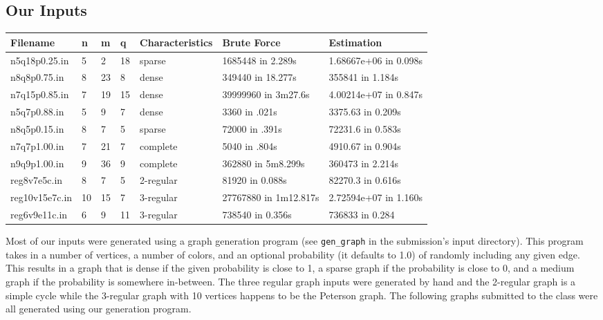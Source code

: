 \documentclass[14]{article}
\begin{document}
\subsection{Our Inputs}
\begin{center}
    \begin{tabular}{ | l | l | l | l | l | l | l | }
    \hline
    \textbf{Filename} & \textbf{n} & \textbf{m} & \textbf{q} & \textbf{Characteristics} & \textbf{Brute Force} & \textbf{Estimation} \\ \hline
    n5q18p0.25.in & 5 & 2 & 18 &sparse & 1685448 in 2.289s &1.68667e+06 in 0.098s   \\ \hline

    n8q8p0.75.in & 8 & 23 & 8 &dense & 349440 in 18.277s &355841 in 1.184s \\ \hline

    n7q15p0.85.in & 7 & 19 & 15 &dense & 39999960 in 3m27.6s & 4.00214e+07 in 0.847s\\ \hline

    n5q7p0.88.in & 5 & 9 & 7 &dense & 3360 in .021s & 3375.63 in 0.209s    \\ \hline

    n8q5p0.15.in & 8 & 7 & 5 &sparse & 72000 in .391s & 72231.6  in 0.583s  \\ \hline

    n7q7p1.00.in & 7 & 21 & 7 &complete & 5040 in .804s &4910.67  in 0.904s\\ \hline

    n9q9p1.00.in & 9 & 36 & 9 &complete & 362880 in 5m8.299s &360473 in 2.214s   \\ \hline

    reg8v7e5c.in & 8 & 7 & 5 & 2-regular & 81920 in 0.088s & 82270.3 in 0.616s \\ \hline

    reg10v15e7c.in & 10 & 15 & 7 & 3-regular & 27767880 in 1m12.817s & 2.72594e+07 in 1.160s \\ \hline

    reg6v9e11c.in & 6 & 9 & 11 & 3-regular & 738540 in 0.356s & 736833 in 0.284\\ \hline
    \end{tabular}
\end{center}
Most of our inputs were generated using a graph generation program (see \texttt{gen\_graph} in the submission's input directory). This program takes in a number of vertices, a number of colors, and an optional probability (it defaults to 1.0) of randomly including any given edge. This results in a graph that is dense if the given probability is close to 1, a sparse graph if the probability is close to 0, and a medium graph if the probability is somewhere in-between. The three regular graph inputs were generated by hand and the 2-regular graph is a simple cycle while the 3-regular graph with 10 vertices happens to be the Peterson graph. The following graphs submitted to the class were all generated using our generation program.
\end{document}
